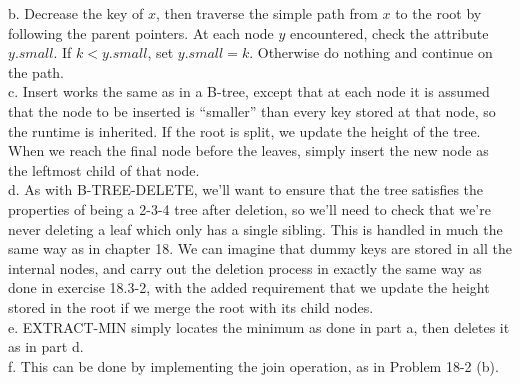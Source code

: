 \documentclass{article}
\begin{document}
b. Decrease the key of $x$, then traverse the simple path from $x$ to the root by following the parent pointers.  At each node $y$ encountered, check the attribute $y.small$.  If $k < y.small$, set $y.small = k$.  Otherwise do nothing and continue on the path. \\

c. Insert works the same as in a B-tree, except that at each node it is assumed that the node to be inserted is ``smaller'' than every key stored at that node, so the runtime is inherited.  If the root is split, we update the height of the tree. When we reach the final node before the leaves, simply insert the new node as the leftmost child of that node. \\

d. As with B-TREE-DELETE, we'll want to ensure that the tree satisfies the properties of being a 2-3-4 tree after deletion, so we'll need to check that we're never deleting a leaf which only has a single sibling.  This is handled in much the same way as in chapter 18.  We can imagine that dummy keys are stored in all the internal nodes, and carry out the deletion process in exactly the same way as done in exercise 18.3-2, with the added requirement that we update the height stored in the root if we merge the root with its child nodes. \\

e. EXTRACT-MIN simply locates the minimum as done in part a, then deletes it as in part d. \\

f. This can be done by implementing the join operation, as in Problem 18-2 (b). \\
\end{document}
